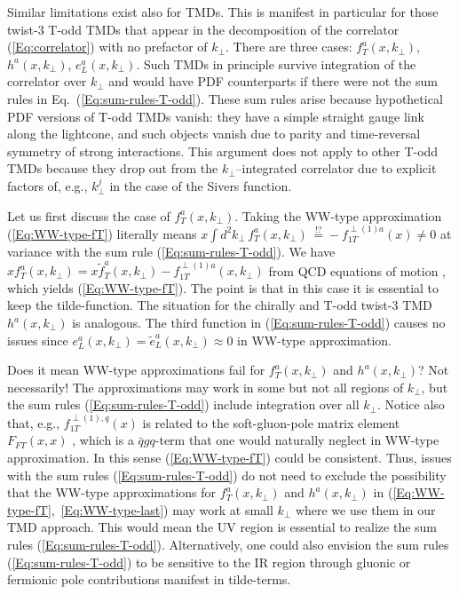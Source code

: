 \documentclass[a4paper,11pt]{article}
\def\kperp{k_\perp}
\begin{document}
Similar limitations exist also for TMDs. This is manifest in particular 
for those twist-3 T-odd TMDs that appear in the decomposition of the 
correlator (\ref{Eq:correlator}) with no prefactor of $\kperp$.
There are three cases: $f_T^a(x,k_\perp)$, $h^a(x,\kperp)$, $e_L^a(x,\kperp)$.
Such TMDs in principle survive integration of the correlator over $\kperp$
and would have PDF counterparts if there were not the sum rules in 
Eq.~(\ref{Eq:sum-rules-T-odd}). These sum rules arise because hypothetical
PDF versions of T-odd TMDs vanish: they have a simple straight gauge link
along the lightcone, and such objects vanish due to parity and time-reversal 
symmetry of strong interactions. This argument does not apply to other T-odd 
TMDs because they drop out from the $\kperp$--integrated correlator due to 
explicit factors of, e.g., $\kperp^j$ in the case of the Sivers function.

Let us first discuss the case of $f_T^a(x,k_\perp)$. Taking the  
WW-type approximation (\ref{Eq:WW-type-fT}) literally means
$x\int d^2 k_\perp\,f_T^a(x,k_\perp)\,\stackrel{!?}{=}
-f_{1T}^{\perp(1)a}(x)\neq0$ 
at variance with the sum rule (\ref{Eq:sum-rules-T-odd}). We 
have $xf_T^a(x,k_\perp)=x\tilde{f}_T^a(x,k_\perp)-f_{1T}^{\perp(1)a}(x,k_\perp)$ 
from QCD equations of motion \cite{Bacchetta:2006tn}, which yields
(\ref{Eq:WW-type-fT}). The point is that in this case it is 
essential to keep the tilde-function. 
The situation for the chirally and T-odd twist-3 
TMD $h^a(x,k_\perp)$ is analogous. The third 
function in (\ref{Eq:sum-rules-T-odd}) causes no issues since 
$e_L^a(x,k_\perp)=\tilde{e}_L^a(x,k_\perp)\approx0$ in WW-type approximation.

Does it mean WW-type approximations fail for $f_T^a(x,k_\perp)$ 
and $h^a(x,k_\perp)$? Not necessarily! The approximations may
work in some but not all regions of $\kperp$, but the sum rules 
(\ref{Eq:sum-rules-T-odd}) include integration over all $k_\perp$. 
Notice also that, e.g., $f_{1T}^{\perp (1),q}(x)$ is related to the 
soft-gluon-pole matrix element $F_{FT}(x,x)$ \cite{Boer:2003cm,Ji:2006ub},
which is a $\bar{q}gq$-term that one would naturally neglect 
in WW-type approximation.
In this sense (\ref{Eq:WW-type-fT}) could be consistent.
Thus, issues with the sum rules 
(\ref{Eq:sum-rules-T-odd}) do not need to exclude the
possibility that the WW-type approximations for $f_T^a(x,k_\perp)$ and
$h^a(x,k_\perp)$ in (\ref{Eq:WW-type-fT},~\ref{Eq:WW-type-last}) 
may work at small $k_\perp$ where we use them in our TMD approach.
This would mean the UV region is essential to realize the sum rules 
(\ref{Eq:sum-rules-T-odd}). Alternatively, one could also envision 
the sum rules (\ref{Eq:sum-rules-T-odd}) to be sensitive to the
IR region through gluonic or fermionic pole contributions manifest
in tilde-terms. 
\end{document}
